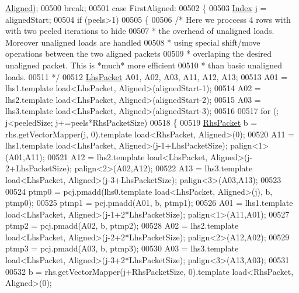 \begin{DoxyCode}
{{      \hyperlink{group__enums_gga45fe06e29902b7a2773de05ba27b47a1ad37d4c71425bb286e9b4103830538fbf}{Aligned});
00500             \textcolor{keywordflow}{break};
00501           \textcolor{keywordflow}{case} FirstAligned:
00502           \{
00503             \hyperlink{namespace_eigen_a62e77e0933482dafde8fe197d9a2cfde}{Index} j = alignedStart;
00504             \textcolor{keywordflow}{if} (peels>1)
00505             \{
00506               \textcolor{comment}{/* Here we proccess 4 rows with with two peeled iterations to hide}
00507 \textcolor{comment}{               * the overhead of unaligned loads. Moreover unaligned loads are handled}
00508 \textcolor{comment}{               * using special shift/move operations between the two aligned packets}
00509 \textcolor{comment}{               * overlaping the desired unaligned packet. This is *much* more efficient}
00510 \textcolor{comment}{               * than basic unaligned loads.}
00511 \textcolor{comment}{               */}
00512               \hyperlink{class_eigen_1_1internal_1_1_tensor_lazy_evaluator_writable}{LhsPacket} A01, A02, A03, A11, A12, A13;
00513               A01 = lhs1.template load<LhsPacket, Aligned>(alignedStart-1);
00514               A02 = lhs2.template load<LhsPacket, Aligned>(alignedStart-2);
00515               A03 = lhs3.template load<LhsPacket, Aligned>(alignedStart-3);
00516 
00517               \textcolor{keywordflow}{for} (; j<peeledSize; j+=peels*RhsPacketSize)
00518               \{
00519                 \hyperlink{class_eigen_1_1internal_1_1_tensor_lazy_evaluator_writable}{RhsPacket} b = rhs.getVectorMapper(j, 0).template load<RhsPacket, Aligned>(0);
00520                 A11 = lhs1.template load<LhsPacket, Aligned>(j-1+LhsPacketSize);  palign<1>(A01,A11);
00521                 A12 = lhs2.template load<LhsPacket, Aligned>(j-2+LhsPacketSize);  palign<2>(A02,A12);
00522                 A13 = lhs3.template load<LhsPacket, Aligned>(j-3+LhsPacketSize);  palign<3>(A03,A13);
00523 
00524                 ptmp0 = pcj.pmadd(lhs0.template load<LhsPacket, Aligned>(j), b, ptmp0);
00525                 ptmp1 = pcj.pmadd(A01, b, ptmp1);
00526                 A01 = lhs1.template load<LhsPacket, Aligned>(j-1+2*LhsPacketSize);  palign<1>(A11,A01);
00527                 ptmp2 = pcj.pmadd(A02, b, ptmp2);
00528                 A02 = lhs2.template load<LhsPacket, Aligned>(j-2+2*LhsPacketSize);  palign<2>(A12,A02);
00529                 ptmp3 = pcj.pmadd(A03, b, ptmp3);
00530                 A03 = lhs3.template load<LhsPacket, Aligned>(j-3+2*LhsPacketSize);  palign<3>(A13,A03);
00531 
00532                 b = rhs.getVectorMapper(j+RhsPacketSize, 0).template load<RhsPacket, Aligned>(0);
}}
\end{DoxyCode}
